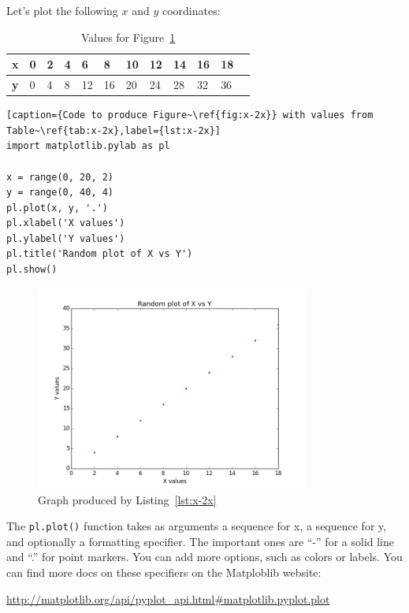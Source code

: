 \documentclass[11pt]{cselabheader}
\begin{document}
Let's plot the following $x$ and $y$ coordinates:

\begin{table}[!ht]
  \centering
  \begin{tabular}{ llllllllllll }
    \bfseries x & 0 & 2 & 4 & 6 & 8 & 10 & 12 & 14 & 16 & 18\\
    \midrule
    \bfseries y & 0 & 4 & 8 & 12 & 16 & 20 & 24 & 28 & 32 & 36
  \end{tabular}
  \caption{Values for Figure~\ref{fig:x-2x}}
  \label{tab:x-2x}
\end{table}

\begin{lstlisting}[caption={Code to produce Figure~\ref{fig:x-2x}} with values from Table~\ref{tab:x-2x},label={lst:x-2x}]
import matplotlib.pylab as pl

x = range(0, 20, 2)
y = range(0, 40, 4)
pl.plot(x, y, '.')
pl.xlabel('X values')
pl.ylabel('Y values')
pl.title('Random plot of X vs Y')
pl.show()
\end{lstlisting}

\begin{figure}[!ht]
  \centering
  \includegraphics[width=0.8\textwidth]{lab11/x-2x-plot.png}
  \caption{Graph produced by Listing~\ref{lst:x-2x}}
  \label{fig:x-2x}
\end{figure}

The \lstinline!pl.plot()! function takes as arguments a sequence for x, a
sequence for y, and optionally a formatting specifier. The important ones are
``-'' for a solid line and ``.'' for point markers. You can add more options,
such as colors or labels. You can find more docs on
these specifiers on the Matploblib website:
\begin{center}
  \url{http://matplotlib.org/api/pyplot_api.html#matplotlib.pyplot.plot}
\end{center}
\end{document}
